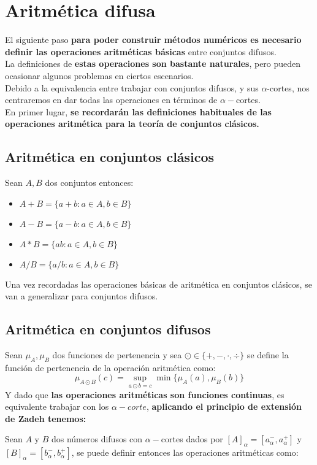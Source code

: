   \section{Aritmética difusa}
  El siguiente paso \textbf{para poder construir métodos numéricos es necesario definir las operaciones aritméticas básicas} entre conjuntos difusos.\\
  La definiciones de \textbf{estas operaciones son bastante naturales}, pero pueden ocasionar algunos problemas en ciertos escenarios.\\
  Debido a la equivalencia entre trabajar con conjuntos difusos, y sus $\alpha$-cortes, nos centraremos en dar todas las operaciones en términos de $\alpha-$cortes.\\
  En primer lugar, \textbf{se recordarán las definiciones habituales de las operaciones aritmética para la teoría de conjuntos clásicos.}

  \subsection{Aritmética en conjuntos clásicos}
  Sean $A, B$ dos conjuntos entonces:
  \begin{itemize}
  \item $A+B=\{a+b : a \in A, b\in B\}$
  \item $A - B =\{a - b : a \in A, b\in B\}$
  \item $A * B =\{ab : a \in A, b\in B\}$
  \item $A / B =\{a/b : a \in A, b\in B\}$
  \end{itemize}

  Una vez recordadas las operaciones básicas de aritmética en conjuntos clásicos, se van a generalizar para conjuntos difusos.

  \subsection{Aritmética en conjuntos difusos}
  Sean $\mu_A, \mu_B$ dos funciones de pertenencia y sea $\odot \in \{+, -, \cdot, \div\}$ se define la función de pertenencia de la operación aritmética como:
  $$
  \mu_{A \odot B}(c) = \sup_{a \odot b = c} \min\{\mu_A(a), \mu_B(b)\}
  $$
  Y dado que \textbf{las operaciones aritméticas son funciones continuas}, es equivalente trabajar con los $\alpha-corte$, \textbf{aplicando el principio de extensión de Zadeh tenemos:}

  Sean $A$ y $B$ dos números difusos con $\alpha-$cortes dados por $[A]_\alpha=[a_\alpha^-, a_\alpha^+]$ y $[B]_\alpha=[b_\alpha^-, b_\alpha^+]$, se puede definir entonces las operaciones aritméticas como:

